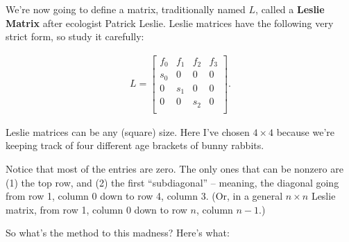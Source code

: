 
We're now going to define a matrix, traditionally named $L$, called a
\textbf{Leslie Matrix} after ecologist Patrick Leslie. Leslie matrices have the
following very strict form, so study it carefully:

\vspace{-.15in}
\begin{align*}
L =
\begin{bmatrix}
f_0 & f_1 & f_2 & f_3 \\
s_0 & 0 & 0 & 0 \\
0 & s_1 & 0 & 0 \\
0 & 0 & s_2 & 0 \\
\end{bmatrix}.
\end{align*}
\vspace{-.15in}

Leslie matrices can be any (square) size. Here I've chosen $4\times 4$ because
we're keeping track of four different age brackets of bunny rabbits.


Notice that most of the entries are zero. The only ones that can be nonzero are
(1) the top row, and (2) the first ``subdiagonal'' -- meaning, the diagonal
going from row 1, column 0 down to row 4, column 3. (Or, in a general $n\times
n$ Leslie matrix, from row 1, column 0 down to row $n$, column $n-1$.)

\medskip
So what's the method to this madness? Here's what:


